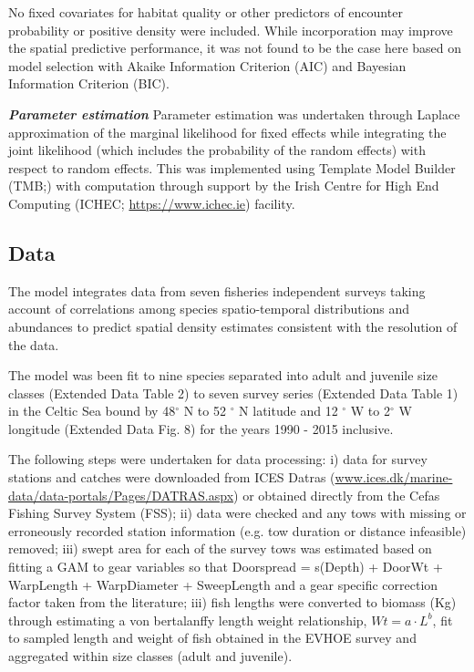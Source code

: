 \documentclass{nature}
\begin{document}
\begin{linenumbers}
No fixed covariates for habitat quality or other predictors of encounter
probability or positive density were included. While incorporation may improve
the spatial predictive performance\cite{Thorson2017}, it was not found to be
the case here based on model selection with Akaike Information Criterion (AIC)
and Bayesian Information Criterion (BIC).

\textbf{\textit{Parameter estimation}} Parameter estimation was undertaken
through Laplace approximation of the marginal likelihood for fixed effects
while integrating the joint likelihood (which includes the probability of the
random effects) with respect to random effects. This was implemented using
Template Model Builder (TMB;\cite{Kristensen2015}) with computation through
support by the Irish Centre for High End Computing (ICHEC;
\url{https://www.ichec.ie}) facility.  

\subsection{Data}

The model integrates data from seven fisheries independent surveys taking
account of correlations among species spatio-temporal distributions and
abundances to predict spatial density estimates consistent with the resolution
of the data. 

The model was been fit to nine species separated into adult and juvenile size
classes (Extended Data Table 2) to seven survey series (Extended Data Table 1)
in the Celtic Sea bound by 48$^{\circ}$ N to 52 $^{\circ}$ N latitude and 12
$^{\circ}$ W to 2$^{\circ}$ W longitude (Extended Data Fig. 8) for the years
1990 - 2015 inclusive. 

The following steps were undertaken for data processing: i) data for survey
stations and catches were downloaded from ICES Datras
(\url{www.ices.dk/marine-data/data-portals/Pages/DATRAS.aspx}) or obtained
directly from the Cefas Fishing Survey System (FSS); ii) data were checked and
any tows with missing or erroneously recorded station information (e.g. tow
duration or distance infeasible) removed; iii) swept area for each of the
survey tows was estimated based on fitting a GAM to gear variables so that
Doorspread = s(Depth) + DoorWt + WarpLength + WarpDiameter + SweepLength and a
gear specific correction factor taken from the literature\cite{Piet2009}; iii)
fish lengths were converted to biomass (Kg) through estimating a von
bertalanffy length weight relationship, $Wt = a \cdot L^{b}$, fit to sampled
length and weight of fish obtained in the EVHOE survey and aggregated within
size classes (adult and juvenile). 


\end{linenumbers}
\end{document}
